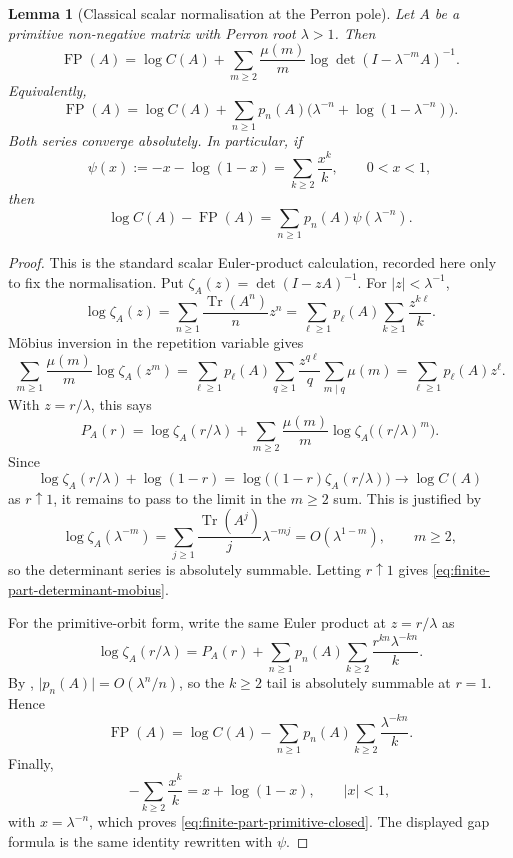 \documentclass[11pt,a4paper]{amsart}
\theoremstyle{plain}
\newtheorem{lemma}[theorem]{Lemma}
\theoremstyle{definition}
\theoremstyle{remark}
\DeclareMathOperator{\Tr}{Tr}
\DeclareMathOperator{\FP}{FP}
\newcommand{\abs}[1]{\lvert #1 \rvert}
\begin{document}
\begin{lemma}[Classical scalar normalisation at the Perron pole]
  \label{lem:finite-part-primitive-closed-form}
  Let \(A\) be a primitive non-negative matrix with Perron root
  \(\lambda>1\). Then
  \begin{equation}\label{eq:finite-part-determinant-mobius}
    \FP(A)
    =
    \log C(A)
    +\sum_{m\ge 2}\frac{\mu(m)}{m}
      \log\det(I-\lambda^{-m}A)^{-1}.
  \end{equation}
  Equivalently,
  \begin{equation}\label{eq:finite-part-primitive-closed}
    \FP(A)
    =
    \log C(A)
    +\sum_{n\ge 1}p_n(A)
      \bigl(\lambda^{-n}+\log(1-\lambda^{-n})\bigr).
  \end{equation}
  Both series converge absolutely. In particular, if
  \[
    \psi(x):=-x-\log(1-x)=\sum_{k\ge 2}\frac{x^k}{k},
    \qquad 0<x<1,
  \]
  then
  \begin{equation}\label{eq:finite-part-gap-series}
    \log C(A)-\FP(A)
    =
    \sum_{n\ge 1}p_n(A)\psi(\lambda^{-n}).
  \end{equation}
\end{lemma}

\begin{proof}
  This is the standard scalar Euler-product calculation, recorded here
  only to fix the normalisation. Put
  \(\zeta_A(z)=\det(I-zA)^{-1}\). For \(|z|<\lambda^{-1}\),
  \[
    \log\zeta_A(z)
    =
    \sum_{n\ge 1}\frac{\Tr(A^n)}{n}z^n
    =
    \sum_{\ell\ge 1}p_\ell(A)\sum_{k\ge 1}\frac{z^{k\ell}}{k}.
  \]
  M\"obius inversion in the repetition variable gives
  \[
    \sum_{m\ge 1}\frac{\mu(m)}{m}\log\zeta_A(z^m)
    =
    \sum_{\ell\ge 1}p_\ell(A)
      \sum_{q\ge 1}
        \frac{z^{q\ell}}{q}\sum_{m\mid q}\mu(m)
    =
    \sum_{\ell\ge 1}p_\ell(A)z^\ell.
  \]
  With \(z=r/\lambda\), this says
  \[
    P_A(r)
    =
    \log\zeta_A(r/\lambda)
    +\sum_{m\ge 2}\frac{\mu(m)}{m}
      \log\zeta_A\bigl((r/\lambda)^m\bigr).
  \]
  Since
  \[
    \log\zeta_A(r/\lambda)+\log(1-r)
    =
    \log\bigl((1-r)\zeta_A(r/\lambda)\bigr)
    \longrightarrow \log C(A)
  \]
  as \(r\uparrow 1\), it remains to pass to the limit in the \(m\ge2\)
  sum. This is justified by
  \[
    \log\zeta_A(\lambda^{-m})
    =
    \sum_{j\ge 1}\frac{\Tr(A^j)}{j}\lambda^{-mj}
    =
    O(\lambda^{1-m}),
    \qquad m\ge 2,
  \]
  so the determinant series is absolutely summable. Letting
  \(r\uparrow1\) gives \eqref{eq:finite-part-determinant-mobius}.

  For the primitive-orbit form, write the same Euler product at
  \(z=r/\lambda\) as
  \[
    \log\zeta_A(r/\lambda)
    =
    P_A(r)
    +\sum_{n\ge 1}p_n(A)\sum_{k\ge 2}
      \frac{r^{kn}\lambda^{-kn}}{k}.
  \]
  By ,
  \(\abs{p_n(A)}=O(\lambda^n/n)\), so the \(k\ge2\) tail is absolutely
  summable at \(r=1\). Hence
  \[
    \FP(A)
    =
    \log C(A)
    -\sum_{n\ge 1}p_n(A)\sum_{k\ge 2}\frac{\lambda^{-kn}}{k}.
  \]
  Finally,
  \[
    -\sum_{k\ge 2}\frac{x^k}{k}=x+\log(1-x),
    \qquad |x|<1,
  \]
  with \(x=\lambda^{-n}\), which proves
  \eqref{eq:finite-part-primitive-closed}. The displayed gap formula is
  the same identity rewritten with \(\psi\).
\end{proof}
\end{document}
